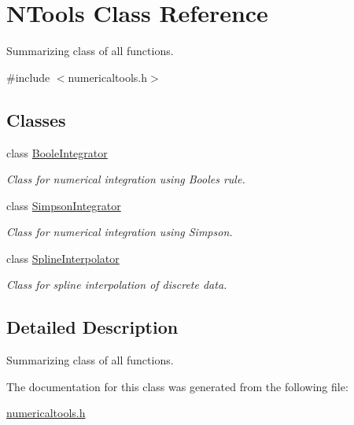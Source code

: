\hypertarget{class_n_tools}{}\section{N\+Tools Class Reference}
\label{class_n_tools}


Summarizing class of all functions.  




{\ttfamily \#include $<$numericaltools.\+h$>$}

\subsection*{Classes}
\begin{DoxyCompactItemize}
\item 
class \mbox{\hyperlink{class_n_tools_1_1_boole_integrator}{Boole\+Integrator}}
\begin{DoxyCompactList}\small\item\em Class for numerical integration using Boole\textquotesingle{}s rule. \end{DoxyCompactList}\item 
class \mbox{\hyperlink{class_n_tools_1_1_simpson_integrator}{Simpson\+Integrator}}
\begin{DoxyCompactList}\small\item\em Class for numerical integration using Simpson. \end{DoxyCompactList}\item 
class \mbox{\hyperlink{class_n_tools_1_1_spline_interpolator}{Spline\+Interpolator}}
\begin{DoxyCompactList}\small\item\em Class for spline interpolation of discrete data. \end{DoxyCompactList}\end{DoxyCompactItemize}


\subsection{Detailed Description}
Summarizing class of all functions. 

The documentation for this class was generated from the following file\+:\begin{DoxyCompactItemize}
\item 
\mbox{\hyperlink{numericaltools_8h}{numericaltools.\+h}}\end{DoxyCompactItemize}
